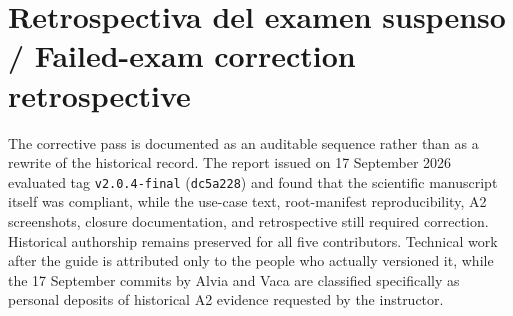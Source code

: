 \documentclass[pdflatex,sn-basic]{sn-jnl}
\begin{document}
\section{Retrospectiva del examen suspenso / Failed-exam correction retrospective}\label{sec:retrospective}
The corrective pass is documented as an auditable sequence rather than as a rewrite of the historical record. The report issued on 17 September 2026 evaluated tag \texttt{v2.0.4-final} (\texttt{dc5a228}) and found that the scientific manuscript itself was compliant, while the use-case text, root-manifest reproducibility, A2 screenshots, closure documentation, and retrospective still required correction. Historical authorship remains preserved for all five contributors. Technical work after the guide is attributed only to the people who actually versioned it, while the 17 September commits by Alvia and Vaca are classified specifically as personal deposits of historical A2 evidence requested by the instructor.
\end{document}
